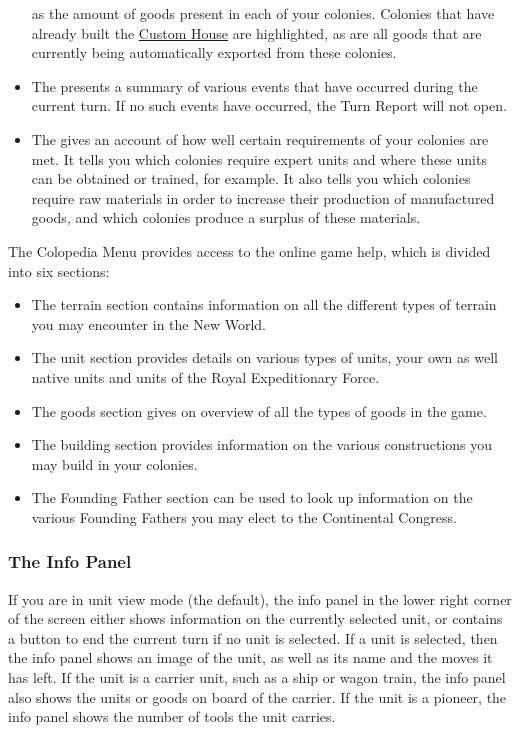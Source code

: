 \documentclass[12pt]{article}
\begin{document}
\begin{itemize}
as the amount of goods present in each of your colonies. Colonies that
have already built the \hyperlink{Custom House}{Custom House} are
highlighted, as are all goods that are currently being automatically
exported from these colonies.
\item The  presents a summary of various events
  that have occurred during the current turn. If no such events have
  occurred, the Turn Report will not open.
\item The  gives an account of how well
certain requirements of your colonies are met. It tells you which
colonies require expert units and where these units can be obtained or
trained, for example. It also tells you which colonies require raw
materials in order to increase their production of manufactured goods,
and which colonies produce a surplus of these materials.
\end{itemize}

The \hypertarget{colopedia menu}{Colopedia Menu} provides access to
the online game help, which is divided into six sections:

\begin{itemize}
\item The terrain section contains information on all the different
types of terrain you may encounter in the New World.
\item The unit section provides details on various types of units,
your own as well native units and units of the Royal Expeditionary
Force.
\item The goods section gives on overview of all the types of goods in
the game.
\item The building section provides information on the various
constructions you may build in your colonies.
\item The Founding Father section can be used to look up information
on the various Founding Fathers you may elect to the Continental
Congress.
\end{itemize}


\hypertarget{info panel}{\subsubsection{The Info Panel}}

If you are in unit view mode (the default), the info panel in the
lower right corner of the screen either shows information on the
currently selected unit, or contains a button to end the current turn
if no unit is selected. If a unit is selected, then the info panel
shows an image of the unit, as well as its name and the moves it has
left. If the unit is a carrier unit, such as a ship or wagon train,
the info panel also shows the units or goods on board of the
carrier. If the unit is a pioneer, the info panel shows the number of
tools the unit carries.
\end{document}
